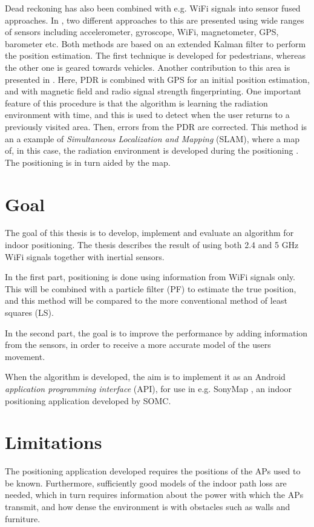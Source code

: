 \documentclass{LTHthesis}
\begin{document}
Dead reckoning has also been combined with e.g. WiFi signals into sensor fused approaches. In \cite{inteli_nav,navio}, two different approaches to this are presented using wide ranges of sensors including accelerometer, gyroscope, WiFi, magnetometer, GPS, barometer etc. Both methods are based on an extended Kalman filter to perform the position estimation. The first technique is developed for pedestrians, whereas the other one is geared towards vehicles. Another contribution to this area is presented in \cite{closer_to_everywhere}. Here, PDR is combined with GPS for an initial position estimation, and with magnetic field and radio signal strength fingerprinting. One important feature of this procedure is that the algorithm is learning the radiation environment with time, and this is used to detect when the user returns to a previously visited area. Then, errors from the PDR are corrected. This method is an a example of \emph{Simultaneous Localization and Mapping} (SLAM), where a map of, in this case, the radiation environment is developed during the positioning \cite{gson12}. The positioning is in turn aided by the map.

\section{Goal}

The goal of this thesis is to develop, implement and evaluate an algorithm for indoor positioning. The thesis describes the result of using both 2.4 and 5 GHz WiFi signals together with inertial sensors.

In the first part, positioning is done using information from WiFi signals only. This will be combined with a particle filter (PF) to estimate the true position, and this method will be compared to the more conventional method of least squares (LS).

In the second part, the goal is to improve the performance by adding information from the sensors, in order to receive a more accurate model of the users movement.

When the algorithm is developed, the aim is to implement it as an Android \emph{application programming interface} (API), for use in e.g. SonyMap \cite{sonymap}, an indoor positioning application developed by SOMC.

\section{Limitations}
%
The positioning application developed requires the positions of the APs used to be known. Furthermore, sufficiently good models of the indoor path loss are needed, which in turn requires information about the power with which the APs transmit, and how dense the environment is with obstacles such as walls and furniture. 
\end{document}
